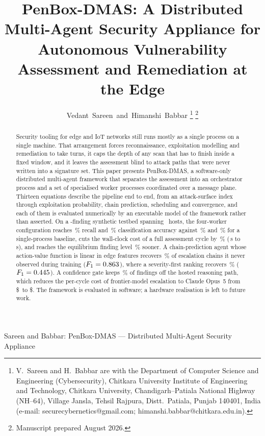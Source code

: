 \documentclass[journal]{IEEEtran}
\begin{document}
\title{PenBox-DMAS: A Distributed Multi-Agent Security Appliance for
       Autonomous Vulnerability Assessment and Remediation at the Edge}

\author{Vedant~Sareen~and~Himanshi~Babbar%
\thanks{V.~Sareen and H.~Babbar are with the Department of Computer Science and
Engineering (Cybersecurity), Chitkara University Institute of Engineering and
Technology, Chitkara University, Chandigarh--Patiala National Highway (NH--64),
Village Jansla, Tehsil Rajpura, Distt.\ Patiala, Punjab 140401, India (e-mail:
securecybernetics@gmail.com; himanshi.babbar@chitkara.edu.in).}%
\thanks{Manuscript prepared August 2026.}}

%
{Sareen \MakeLowercase{and} Babbar: PenBox-DMAS --- Distributed Multi-Agent Security Appliance}

\maketitle

\begin{abstract}
Security tooling for edge and IoT networks still runs mostly as a single
process on a single machine. That arrangement forces reconnaissance,
exploitation modelling and remediation to take turns, it caps the depth of any
scan that has to finish inside a fixed window, and it leaves the assessment
blind to attack paths that were never written into a signature set. This paper
presents PenBox-DMAS, a software-only distributed multi-agent framework that
separates the assessment into an orchestrator process and a set of specialised
worker processes coordinated over a message plane. Thirteen equations describe
the pipeline end to end, from an attack-surface index through exploitation
probability, chain prediction, scheduling and convergence, and each of them is
evaluated numerically by an executable model of the framework rather than
asserted. On a \numVuln-finding synthetic testbed spanning \numHosts\ hosts,
the four-worker configuration reaches \recC\,\% recall and \accC\,\%
classification accuracy against \recA\,\% and \accA\,\% for a single-process
baseline, cuts the wall-clock cost of a full assessment cycle by
\latCutC\,\% (\msA\,s to \msC\,s), and reaches the equilibrium finding level
\convCut\,\% sooner. A chain-prediction agent whose action-value function is
linear in edge features recovers \rlRate\,\% of escalation chains it never
observed during training ($F_1=0.863$), where a severity-first ranking
recovers \heurRate\,\% ($F_1=0.445$). A confidence gate keeps
\escFrac\,\% of findings off the hosted reasoning path, which reduces the
per-cycle cost of frontier-model escalation to Claude Opus~5 from
\$\costAllOpus\ to \$\costOpus. The framework is evaluated in software; a
hardware realisation is left to future work.
\end{abstract}
\end{document}
